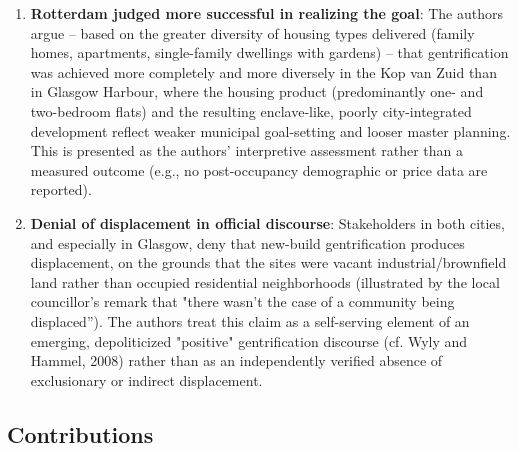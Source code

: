 \begin{enumerate}
  \item \textbf{Rotterdam judged more successful in realizing the goal}: The authors argue -- based on the greater diversity of housing types delivered (family homes, apartments, single-family dwellings with gardens) -- that gentrification was achieved more completely and more diversely in the Kop van Zuid than in Glasgow Harbour, where the housing product (predominantly one- and two-bedroom flats) and the resulting enclave-like, poorly city-integrated development reflect weaker municipal goal-setting and looser master planning. This is presented as the authors' interpretive assessment rather than a measured outcome (e.g., no post-occupancy demographic or price data are reported).
  \item \textbf{Denial of displacement in official discourse}: Stakeholders in both cities, and especially in Glasgow, deny that new-build gentrification produces displacement, on the grounds that the sites were vacant industrial/brownfield land rather than occupied residential neighborhoods (illustrated by the local councillor's remark that "there wasn't the case of a community being displaced''). The authors treat this claim as a self-serving element of an emerging, depoliticized "positive" gentrification discourse (cf. Wyly and Hammel, 2008) rather than as an independently verified absence of exclusionary or indirect displacement.
\end{enumerate}

\subsection*{Contributions}

